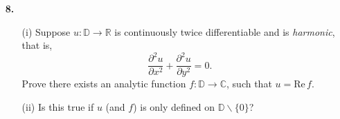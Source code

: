 \documentclass[12pt]{article}
\begin{document}
\begin{itemize}
{\sc Hint:} Consider the function $g(z)=\overline{f(\bar{z})}$.


\item[{\bf 8.}]\begin{itemize}
\item[(i)] Suppose $u:\mathbb{D}\to\mathbb{R}$ is continuously
   twice differentiable and is {\em harmonic}, that is,
$$\frac{\partial^2u}{\partial x^2}+\frac{\partial^2u}{\partial y^2}=0.$$
Prove there exists an analytic function $f:\mathbb{D}\to\mathbb{C}$, such that
$u=\text{Re}\,f.$
\item[(ii)] Is this true if $u$ (and $f$) is only defined on $\mathbb{D}\smallsetminus\{0\}$?
\end{itemize}

\end{itemize}
\end{document}
